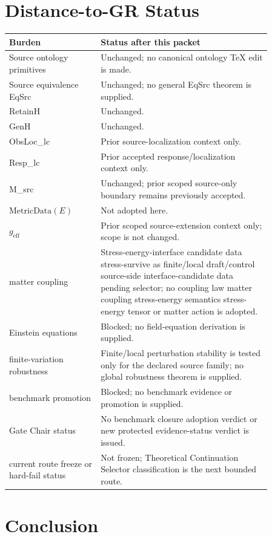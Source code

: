 \documentclass[11pt]{article}
\newcommand{\MetricData}{\mathrm{MetricData}}
\newcommand{\geff}{g_{\mathrm{eff}}}
\begin{document}
\section{Distance-to-GR Status}

\begin{longtable}{p{0.30\linewidth}p{0.56\linewidth}}
\toprule
Burden & Status after this packet \\
\midrule
Source ontology primitives & Unchanged; no canonical ontology TeX edit is made. \\
Source equivalence EqSrc & Unchanged; no general EqSrc theorem is supplied. \\
RetainH & Unchanged. \\
GenH & Unchanged. \\
ObsLoc\_lc & Prior source-localization context only. \\
Resp\_lc & Prior accepted response/localization context only. \\
M\_src & Unchanged; prior scoped source-only boundary remains previously accepted. \\
\(\MetricData(E)\) & Not adopted here. \\
\(\geff\) & Prior scoped source-extension context only; scope is not changed. \\
matter coupling & Stress-energy-interface candidate data stress-survive as finite/local draft/control source-side interface-candidate data pending selector; no coupling law matter coupling stress-energy semantics stress-energy tensor or matter action is adopted. \\
Einstein equations & Blocked; no field-equation derivation is supplied. \\
finite-variation robustness & Finite/local perturbation stability is tested only for the declared source family; no global robustness theorem is supplied. \\
benchmark promotion & Blocked; no benchmark evidence or promotion is supplied. \\
Gate Chair status & No benchmark closure adoption verdict or new protected evidence-status verdict is issued. \\
current route freeze or hard-fail status & Not frozen; Theoretical Continuation Selector classification is the next bounded route. \\
\bottomrule
\end{longtable}

\section{Conclusion}
\end{document}
